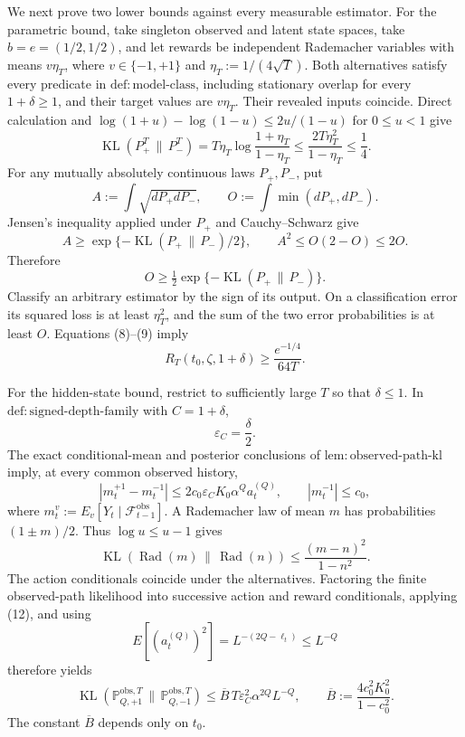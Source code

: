 We next prove two lower bounds against every measurable estimator.  For the parametric bound, take singleton observed and latent state spaces, take \(b=e=(1/2,1/2)\), and let rewards be independent Rademacher variables with means \(v\eta_T\), where \(v\in\{-1,+1\}\) and \(\eta_T:=1/(4\sqrt T)\).  Both alternatives satisfy every predicate in \(\mathrm{def{:}model\text{-}class}\), including stationary overlap for every \(1+\delta\ge1\), and their target values are \(v\eta_T\).  Their revealed inputs coincide.  Direct calculation and \(\log(1+u)-\log(1-u)\le2u/(1-u)\) for \(0\le u<1\) give
\[
 \operatorname{KL}(P_+^T\,\|\,P_-^T)
 =T\eta_T\log\frac{1+\eta_T}{1-\eta_T}
 \le\frac{2T\eta_T^2}{1-\eta_T}\le\frac14. \tag{8}
\]
For any mutually absolutely continuous laws \(P_+,P_-\), put
\[
 A:=\int\sqrt{dP_+dP_-},
 \qquad O:=\int\min(dP_+,dP_-).
\]
Jensen's inequality applied under \(P_+\) and Cauchy--Schwarz give
\[
 A\ge \exp\{-\operatorname{KL}(P_+\,\|\,P_-)/2\},
 \qquad
 A^2\le O(2-O)\le2O.
\]
Therefore
\[
 O\ge\tfrac12\exp\{-\operatorname{KL}(P_+\,\|\,P_-)\}. \tag{9}
\]
Classify an arbitrary estimator by the sign of its output.  On a classification error its squared loss is at least \(\eta_T^2\), and the sum of the two error probabilities is at least \(O\).  Equations (8)--(9) imply
\[
 R_T(t_0,\zeta,1+\delta)
 \ge \frac{e^{-1/4}}{64T}. \tag{10}
\]

For the hidden-state bound, restrict to sufficiently large \(T\) so that \(\delta\le1\).  In \(\mathrm{def{:}signed\text{-}depth\text{-}family}\) with \(C=1+\delta\),
\[
 \varepsilon_C=\frac\delta2. \tag{11}
\]
The exact conditional-mean and posterior conclusions of \(\mathrm{lem{:}observed\text{-}path\text{-}kl}\) imply, at every common observed history,
\[
 |m_t^{+1}-m_t^{-1}|
 \le2c_0\varepsilon_CK_0\alpha^Qa_t^{(Q)},
 \qquad |m_t^{-1}|\le c_0,
\]
where \(m_t^v:=E_v[Y_t\mid\mathcal F_{t-1}^{\mathrm{obs}}]\).  A Rademacher law of mean \(m\) has probabilities \((1\pm m)/2\).  Thus \(\log u\le u-1\) gives
\[
 \operatorname{KL}(\operatorname{Rad}(m)\,\|\,\operatorname{Rad}(n))
 \le\frac{(m-n)^2}{1-n^2}. \tag{12}
\]
The action conditionals coincide under the alternatives.  Factoring the finite observed-path likelihood into successive action and reward conditionals, applying (12), and using
\[
 E[(a_t^{(Q)})^2]
 =L^{-(2Q-\ell_t)}\le L^{-Q}
\]
therefore yields
\[
 \operatorname{KL}(\mathbb P_{Q,+1}^{\mathrm{obs},T}\,\|\,
                    \mathbb P_{Q,-1}^{\mathrm{obs},T})
 \le \overline B\,T\varepsilon_C^2\alpha^{2Q}L^{-Q},
 \qquad
 \overline B:=\frac{4c_0^2K_0^2}{1-c_0^2}. \tag{13}
\]
The constant \(\overline B\) depends only on \(t_0\).


